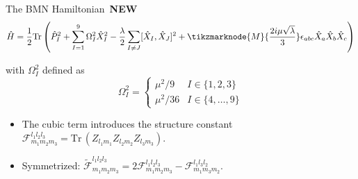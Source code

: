 \documentclass{beamer}
\newcommand{\new}[1]{{\color{metuaccent}\textbf{#1}}}
\newcommand{\newflag}{\hfill{\footnotesize\colorbox{metugold}{\color{white}\bfseries\,NEW\,}}}
\newcommand{\Tr}{\mathrm{Tr}\,}
\begin{document}
\begin{frame}{The BMN Hamiltonian \newflag}
  \begin{equation*}
    \hat H=\frac{1}{2}\Tr\!\left(\hat P_I^2+\sum_{I=1}^{9}\Omega_I^2\hat X_I^2
      -\frac{\lambda}{2}\sum_{I\neq J}[\hat X_I,\hat X_J]^2
      +\tikzmarknode{M}{\frac{2i\mu\sqrt{\lambda}}{3}}\epsilon_{abc}\hat X_a\hat X_b\hat X_c\right)
  \end{equation*}
  \vspace{1.6cm}

  with $\Omega_I^2$ defined as
  \begin{equation*}
    \Omega_I^2=\begin{cases}\mu^2/9 & I\in\{1,2,3\}\\[2pt]\mu^2/36 & I\in\{4,\dots,9\}\end{cases}
  \end{equation*}


  \begin{itemize}\footnotesize
    \item The cubic term introduces the structure constant $\mathcal{F}^{l_1l_2l_3}_{m_1m_2m_3}=\Tr(Z_{l_1m_1}Z_{l_2m_2}Z_{l_3m_3})$.
    \item Symmetrized: $\widetilde{\mathcal{F}}^{l_1l_2l_3}_{m_1m_2m_3}=2\mathcal{F}^{l_1l_2l_3}_{m_1m_2m_3}-\mathcal{F}^{l_1l_3l_2}_{m_1m_3m_2}$.
  \end{itemize}
\end{frame}
\end{document}
